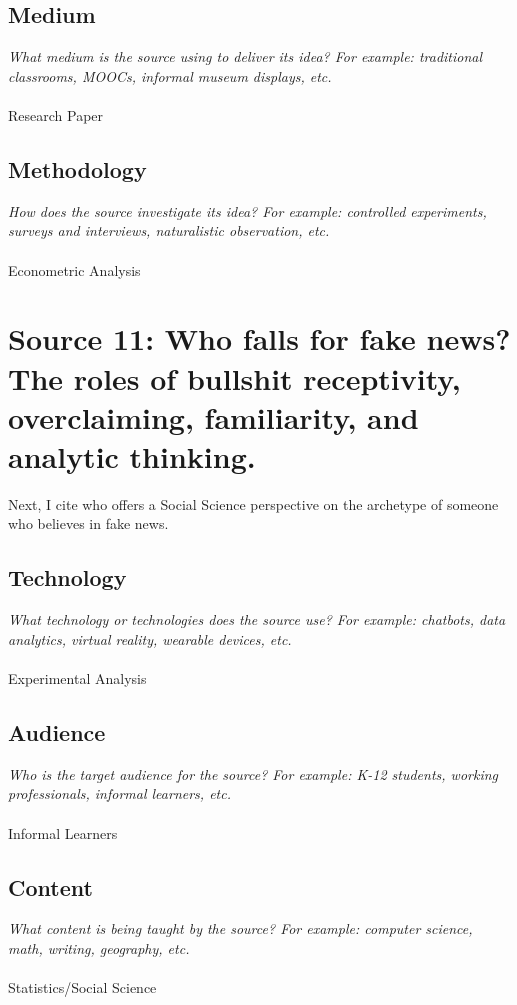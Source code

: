 \documentclass[12pt, final]{article}
\begin{document}
\subsection{Medium}
\textit{What medium is the source using to deliver its idea? For example: traditional classrooms, MOOCs, informal museum displays, etc.}
\\
\\
Research Paper

\subsection{Methodology}
\textit{How does the source investigate its idea? For example: controlled experiments, surveys and interviews, naturalistic observation, etc.}
\\
\\
Econometric Analysis

\section{Source 11: Who falls for fake news? The roles of bullshit receptivity, overclaiming, familiarity, and analytic thinking.}
\label{Source 11}

Next, I cite \cite{Pennycook} who offers a Social Science perspective on the archetype of someone who believes in fake news.

\subsection{Technology}
\textit{What technology or technologies does the source use? For example: chatbots, data analytics, virtual reality, wearable devices, etc.}
\\
\\
Experimental Analysis

\subsection{Audience}
\textit{Who is the target audience for the source? For example: K-12 students, working professionals, informal learners, etc.}
\\
\\
Informal Learners

\subsection{Content}
\textit{What content is being taught by the source? For example: computer science, math, writing, geography, etc.}
\\
\\
Statistics/Social Science
\end{document}
